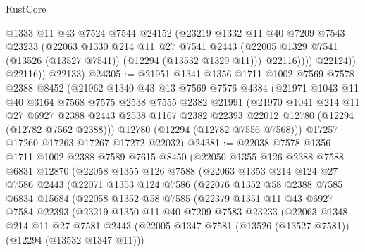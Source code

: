 \begin{lexlean}{RustCore}
\begin{coremodule}
                  @1333
                  @11
                  @43
                  @7524
                  @7544
                  @24152
                  (@23219
                    @1332
                    @11
                    @40
                    @7209
                    @7543
                    @23233
                    (@22063
                      @1330
                      @214
                      @11
                      @27
                      @7541
                      @2443
                      (@22005 @1329 @7541 (@13526 (@13527 @7541)) (@12294 (@13532 @1329 @11)))
                      @22116))))
              @22124))
          @22116))
      @22133)
@24305 := @21951
    @1341
    @1356
    @1711
    @1002
    @7569
    @7578
    @2388
    @8452
    (@21962
      @1340
      @43
      @13
      @7569
      @7576
      @4384
      (@21971
        @1043
        @11
        @40
        @3164
        @7568
        @7575
        @2538
        @7555
        @2382
        @21991
        (@21970
          @1041
          @214
          @11
          @27
          @6927
          @2388
          @2443
          @2538
          @1167
          @2382
          @22393
          @22012
          @12780
          (@12294 (@12782 @7562 @2388)))
        @12780
        (@12294 (@12782 @7556 @7568)))
      @17257
      @17260
      @17263
      @17267
      @17272
      @22032)
@24381 := @22038
    @7578
    @1356
    @1711
    @1002
    @2388
    @7589
    @7615
    @8450
    (@22050
      @1355
      @126
      @2388
      @7588
      @6831
      @12870
      (@22058
        @1355
        @126
        @7588
        (@22063
          @1353
          @214
          @124
          @27
          @7586
          @2443
          (@22071
            @1353
            @124
            @7586
            (@22076
              @1352
              @58
              @2388
              @7585
              @6834
              @15684
              (@22058
                @1352
                @58
                @7585
                (@22379
                  @1351
                  @11
                  @43
                  @6927
                  @7584
                  @22393
                  (@23219
                    @1350
                    @11
                    @40
                    @7209
                    @7583
                    @23233
                    (@22063
                      @1348
                      @214
                      @11
                      @27
                      @7581
                      @2443
                      (@22005 @1347 @7581 (@13526 (@13527 @7581)) (@12294 (@13532 @1347 @11)))

\end{coremodule}
\end{lexlean}
